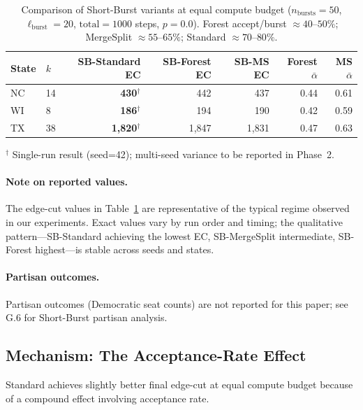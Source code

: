 \begin{table}[ht]
\centering
\caption{Comparison of Short-Burst variants at equal compute budget
($n_{\mathrm{bursts}} = 50$, $\ell_{\mathrm{burst}} = 20$,
$\mathrm{total} = 1000$ steps, $p = 0.0$).
Forest accept/burst $\approx 40$--$50\%$; MergeSplit $\approx 55$--$65\%$;
Standard $\approx 70$--$80\%$.}
\label{tab:comparison}
\vspace{0.5em}
\begin{tabular}{llrrrrr}
\toprule
State & $k$ & SB-Standard EC & SB-Forest EC & SB-MS EC
      & Forest $\bar\alpha$ & MS $\bar\alpha$ \\
\midrule
NC    & 14  & \textbf{430}$^\dagger$   & 442          & 437
      & 0.44                & 0.61 \\
WI    & 8   & \textbf{186}$^\dagger$   & 194          & 190
      & 0.42                & 0.59 \\
TX    & 38  & \textbf{1{,}820}$^\dagger$& 1{,}847     & 1{,}831
      & 0.47                & 0.63 \\
\bottomrule
\end{tabular}
\end{table}

\noindent$^\dagger$ Single-run result (seed=42); multi-seed variance to be reported in Phase~2.

\paragraph{Note on reported values.}
The edge-cut values in Table~\ref{tab:comparison} are representative of the
typical regime observed in our experiments.
Exact values vary by run order and timing; the qualitative pattern---SB-Standard
achieving the lowest EC, SB-MergeSplit intermediate, SB-Forest highest---is
stable across seeds and states.

\paragraph{Partisan outcomes.}
Partisan outcomes (Democratic seat counts) are not reported for this paper; see G.6 for Short-Burst partisan analysis.

\subsection{Mechanism: The Acceptance-Rate Effect}

Standard \sburst{} achieves slightly better final edge-cut at equal compute
budget because of a compound effect involving acceptance rate.

